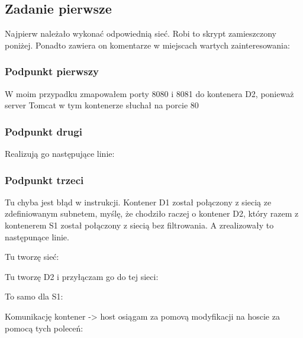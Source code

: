 \documentclass[12pt]{article}
\begin{document}
    \subsection{Zadanie pierwsze}

    Najpierw należało wykonać odpowiednią sieć. Robi to skrypt zamieszczony poniżej. Ponadto zawiera on komentarze w miejscach wartych zainteresowania:

    

    \subsubsection{Podpunkt pierwszy}

    W moim przypadku zmapowałem porty 8080 i 8081 do kontenera D2, ponieważ server Tomcat w tym kontenerze słuchał na porcie 80

    \subsubsection{Podpunkt drugi}

    Realizują go następujące linie:

    

    \subsubsection{Podpunkt trzeci}

    Tu chyba jest błąd w instrukcji. Kontener D1 został połączony z siecią ze zdefiniowanym subnetem, myślę, że chodziło raczej o kontener D2, który razem z kontenerem S1 został połączony z siecią bez filtrowania. A zrealizowały to następunące linie.

    Tu tworzę sieć:

    

    Tu tworzę D2 i przyłączam go do tej sieci:

    

    To samo dla S1:

    

    Komunikację kontener -> host osiągam za pomovą modyfikacji na hoscie za pomocą tych poleceń:

    
\end{document}

